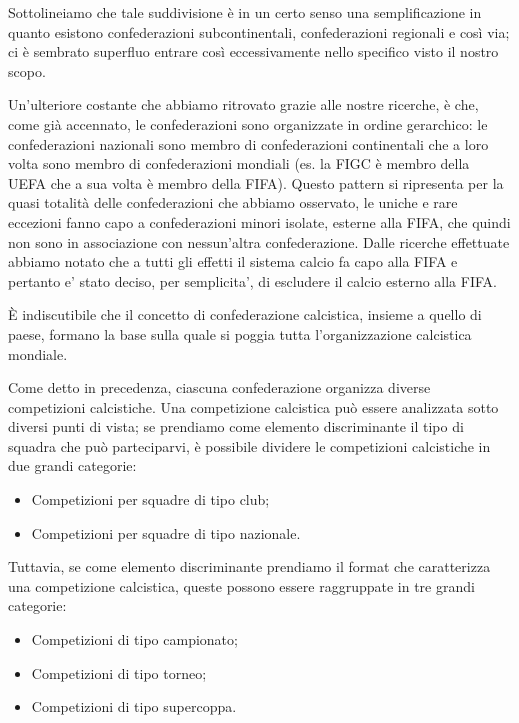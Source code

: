 Sottolineiamo che tale suddivisione è in un certo senso una semplificazione in quanto
esistono confederazioni subcontinentali, confederazioni regionali e così via; ci è sembrato
superfluo entrare così eccessivamente nello specifico visto il nostro scopo.

Un'ulteriore costante che abbiamo ritrovato grazie alle nostre ricerche, è che,
come già accennato, le confederazioni sono organizzate in ordine gerarchico: le confederazioni
nazionali sono membro di confederazioni continentali che a loro volta sono
membro di confederazioni mondiali (es. la FIGC è membro della UEFA che a sua volta è membro
della FIFA).
Questo pattern si ripresenta per la quasi totalità delle confederazioni che abbiamo osservato,
le uniche e rare eccezioni fanno capo a confederazioni minori isolate, esterne alla FIFA,
che quindi non sono in associazione con nessun'altra confederazione.
Dalle ricerche effettuate abbiamo notato che a tutti gli effetti il sistema calcio fa capo
alla FIFA e pertanto e' stato deciso, per semplicita', di escludere il calcio esterno alla FIFA.

È indiscutibile che il concetto di confederazione calcistica, insieme a quello di paese,
formano la base sulla quale si poggia tutta l'organizzazione calcistica mondiale.

\bigskip
\bigskip

Come detto in precedenza, ciascuna confederazione organizza diverse competizioni calcistiche.
Una competizione calcistica può essere analizzata sotto diversi punti di vista;
se prendiamo come elemento discriminante il tipo di squadra che può parteciparvi, è possibile
dividere le competizioni calcistiche in due grandi categorie:
\begin{itemize}
	\item Competizioni per squadre di tipo club;
	\item Competizioni per squadre di tipo nazionale.
\end{itemize}

Tuttavia, se come elemento discriminante prendiamo il format che caratterizza una competizione
calcistica, queste possono essere raggruppate in tre grandi categorie:
\begin{itemize}
	\item Competizioni di tipo campionato;
	\item Competizioni di tipo torneo;
	\item Competizioni di tipo supercoppa.
\end{itemize}

